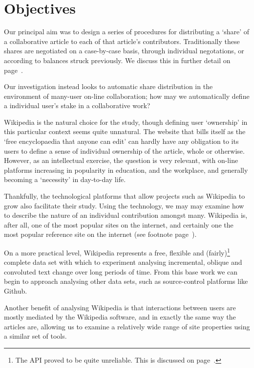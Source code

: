 \section{Objectives}
Our principal aim was to design a series of procedures for
distributing a `share' of a collaborative article to each of that
article's contributors. Traditionally these shares are negotiated on a
case-by-case basis, through individual negotations, or according to
balances struck previously. We discuss this in further detail on
page~\pageref{sec:copyright}.

Our investigation instead looks to automatic share distribution in the
environment of many-user on-line collaboration; how may we
automatically define a individual user's stake in a collaborative
work?

Wikipedia is the natural choice for the study, though defining user
`ownership' in this particular context seems quite unnatural. The
website that bills itself as the `free encyclopaedia that anyone can
edit' can hardly have any obligation to its users to define a sense of
individual ownership of the article, whole or
otherwise.\cite{wiki-copyr} However, as an intellectual exercise, the
question is very relevant, with on-line platforms increasing in
popularity in education,\cite{wiki-collab} and the
workplace,\cite{workplace-future} and generally becoming a `necessity'
in day-to-day life.\cite{alsurvey}

Thankfully, the technological platforms that allow projects such as
Wikipedia to grow also facilitate their study. Using the technology,
we may may examine how to describe the nature of an individual
contribution amongst many. Wikipedia is, after all, one of the most
popular sites on the internet, and certainly one the most popular
reference site on the internet (see footnote
page~\pageref{sec:popularity}).

On a more practical level, Wikipedia represents a free, flexible and
(fairly)\footnote{The API proved to be quite unreliable. This is
  discussed on page~\pageref{sec:wiki-api}.} complete data set with
which to experiment analysing incremental, oblique and convoluted text
change over long periods of time. From this base work we can begin to
approach analysing other data sets, such as source-control platforms
like Github.

Another benefit of analysing Wikipedia is that interactions between
users are mostly mediated by the Wikipedia software, and in exactly
the same way the articles are, allowing us to examine a relatively
wide range of site properties using a similar set of tools.

